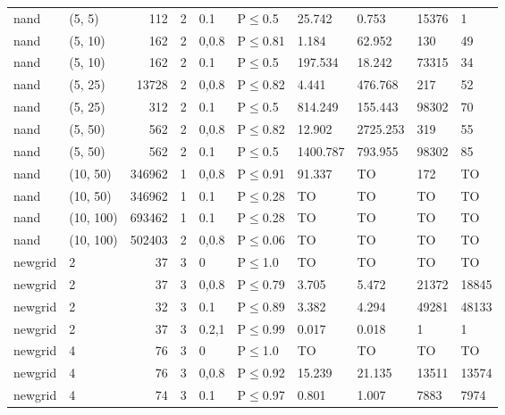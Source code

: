 \begin{longtable}{llrrllllll}
 nand          & (5, 5)    &    	112 &   2 & 0.1   & P$\leq$0.5   & 25.742   & 0.753    & 15376   & 1      \\
 nand          & (5, 10)   &    	162 &   2 & 0,0.8 & P$\leq$0.81  & 1.184    & 62.952   & 130     & 49     \\
 nand          & (5, 10)   &    	162 &   2 & 0.1   & P$\leq$0.5   & 197.534  & 18.242   & 73315   & 34     \\
 nand          & (5, 25)   &  	13728 &   2 & 0,0.8 & P$\leq$0.82  & 4.441    & 476.768  & 217     & 52     \\
 nand          & (5, 25)   &    	312 &   2 & 0.1   & P$\leq$0.5   & 814.249  & 155.443  & 98302   & 70     \\
 nand          & (5, 50)   &    	562 &   2 & 0,0.8 & P$\leq$0.82  & 12.902   & 2725.253 & 319     & 55     \\
 nand          & (5, 50)   &    	562 &   2 & 0.1   & P$\leq$0.5   & 1400.787 & 793.955  & 98302   & 85     \\
 nand          & (10, 50)  & 	346962 &   1 & 0,0.8 & P$\leq$0.91  & 91.337   & TO       & 172     & TO     \\
 nand          & (10, 50)  & 	346962 &   1 & 0.1   & P$\leq$0.28  & TO       & TO       & TO      & TO     \\
 nand          & (10, 100) & 	693462 &   1 & 0.1   & P$\leq$0.28  & TO       & TO       & TO      & TO     \\
 nand          & (10, 100) & 	502403 &   2 & 0,0.8 & P$\leq$0.06  & TO       & TO       & TO      & TO     \\
 newgrid       & 2         &     	37 &   3 & 0     & P$\leq$1.0   & TO       & TO       & TO      & TO     \\
 newgrid       & 2         &     	37 &   3 & 0,0.8 & P$\leq$0.79  & 3.705    & 5.472    & 21372   & 18845  \\
 newgrid       & 2         &     	32 &   3 & 0.1   & P$\leq$0.89  & 3.382    & 4.294    & 49281   & 48133  \\
 newgrid       & 2         &     	37 &   3 & 0.2,1 & P$\leq$0.99  & 0.017    & 0.018    & 1       & 1      \\
 newgrid       & 4         &     	76 &   3 & 0     & P$\leq$1.0   & TO       & TO       & TO      & TO     \\
 newgrid       & 4         &     	76 &   3 & 0,0.8 & P$\leq$0.92  & 15.239   & 21.135   & 13511   & 13574  \\
 newgrid       & 4         &     	74 &   3 & 0.1   & P$\leq$0.97  & 0.801    & 1.007    & 7883    & 7974   \\

\end{longtable}
